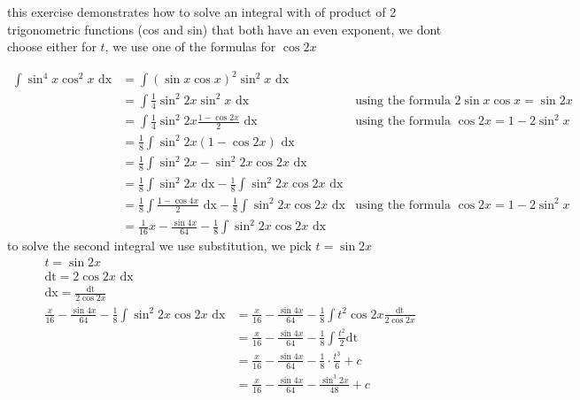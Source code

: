 \documentclass[a4paper,12pt]{article}
\newcommand{\?}{\stackrel{?}{=}}
\begin{document}
\begin{definition}
\begin{my_example}
\begin{note}
this exercise demonstrates how to solve an integral with of product of 2 trigonometric functions (cos and sin) that both have an even exponent, we dont choose either for \(t\), we use one of the formulas for \(\cos 2x\)\\[0pt]
\end{note}
\begin{align*}
  \int \sin^4 x \cos^2x \text{ dx} &= \int {(\sin x\cos x)}^2 \sin^2 x \text{ dx}\\
  &= \int \frac14 \sin^2 2x \sin^2 x \text{ dx} &\text{using the formula } 2\sin x \cos x = \sin 2x\\
  &= \int \frac14 \sin^2 2x \frac{1 - \cos 2x}{2} \text{ dx} &\text{using the formula } \cos 2x = 1 - 2\sin^2 x\\
  &= \frac18 \int \sin^2 2x (1 - \cos 2x) \text{ dx}\\
  &= \frac18 \int \sin^2 2x - \sin^2 2x \cos 2x \text{ dx}\\
  &= \frac18 \int \sin^2 2x \text{ dx} - \frac18 \int \sin^2 2x \cos 2x \text{ dx}\\
  &= \frac18 \int \frac{1 - \cos 4x}{2} \text{ dx} - \frac18 \int \sin^2 2x \cos 2x \text{ dx} &\text{using the formula } \cos 2x = 1 - 2\sin^2 x\\
  &= \frac{1}{16} x - \frac{\sin{4x}}{64} - \frac18 \int \sin^2 2x \cos 2x \text{ dx}
\end{align*}
to solve the second integral we use substitution, we pick \(t = \sin 2x\)\\[0pt]

\begin{align*}
  t = \sin 2x\\
  \text{dt} = 2\cos{2x} \text{ dx}\\
  \text{dx} = \frac{\text{dt}}{2\cos 2x}\\
  \frac{x}{16} - \frac{\sin{4x}}{64} - \frac18 \int \sin^2 2x \cos 2x \text{ dx} &= \frac{x}{16} - \frac{\sin{4x}}{64} - \frac18 \int t^2 \cos 2x \frac{\text{dt}}{2\cos 2x}\\
  &= \frac{x}{16} - \frac{\sin{4x}}{64} - \frac18 \int \frac{t^2}{2} \text{dt}\\
  &= \frac{x}{16} - \frac{\sin{4x}}{64} - \frac18 \cdot \frac{t^3}{6} + c\\
  &= \frac{x}{16} - \frac{\sin{4x}}{64} - \frac{\sin^3 2x}{48} + c
\end{align*}
\end{my_example}


\end{definition}
\end{document}
